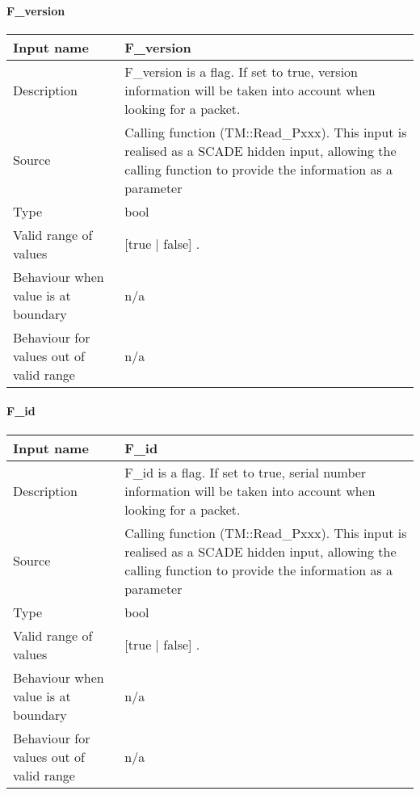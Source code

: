 

\paragraph{F\_version}

\begin{longtable}{p{}p{}}
\toprule
Input name				&F\_version \\
\midrule
Description				& F\_version is a flag. If set to true, version information will be taken into account when looking for a packet.\newline

  \\
\midrule
Source					& Calling function  (TM::Read\_Pxxx). This input is realised as a SCADE hidden input, allowing the calling function to provide the information as a parameter \\ 
\midrule
Type					& bool \\
\midrule
Valid range of values 	& [true | false]
.\newline

 \\
\midrule
Behaviour when value is at boundary	& n/a \\
\midrule
Behaviour for values out of valid range	& n/a  \newline
 \\
\bottomrule
\end{longtable}


\paragraph{F\_id}

\begin{longtable}{p{}p{}}
\toprule
Input name				&F\_id \\
\midrule
Description				& F\_id is a flag. If set to true, serial number information will be taken into account when looking for a packet.\newline

  \\
\midrule
Source					& Calling function  (TM::Read\_Pxxx). This input is realised as a SCADE hidden input, allowing the calling function to provide the information as a parameter \\ 
\midrule
Type					& bool \\
\midrule
Valid range of values 	& [true | false]
.\newline

 \\
\midrule
Behaviour when value is at boundary	& n/a \\
\midrule
Behaviour for values out of valid range	& n/a  \newline

 \\
\bottomrule
\end{longtable}

